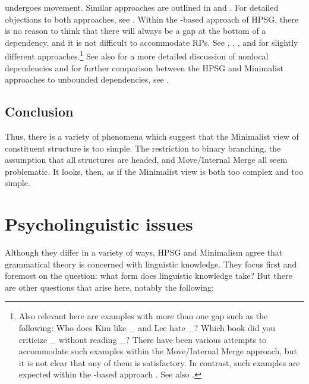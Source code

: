 \documentclass[output=paper
 	        ,biblatex
                ,babelshorthands
                ,newtxmath
                ,draftmode
                ,colorlinks, citecolor=brown
]{langscibook}
\begin{document}
undergoes movement. Similar approaches are outlined in \citet{AounChoueiriHornstein2001a-u} and
\citet{Boeckx.2003}. For detailed objections to both approaches, see
\citet[Section~3]{Borsley2013a-u}. Within the \slasch-based approach of HPSG, there is no reason to
think that there will always be a gap at the bottom of a dependency, and it is not difficult to
accommodate RPs. See \citet{Vaillette2001b}, \citet{Taghvaipour2010a-u}, \citet{Borsley2013a-u}, and \citet{crysmann_b10fg,Crysmann2016b-u} for slightly
different approaches.\footnote{%
	Also relevant here are examples with more than one gap such as the following:
	\eal
	\ex	Who does Kim like \_ and Lee hate \_?
	\ex	Which book did you criticize \_ without reading \_?
	\zl
	There have been various attempts to accommodate such examples within the Move/Internal Merge
        approach, but it is not clear that any of them is satisfactory. In contrast, such examples
        are expected within the \slasch-based approach \citep{LS2003a-u}. See also \citet[Section~4.6]{ps2}.%
}
See also  for a more detailed discussion of nonlocal dependencies and for
further comparison between the HPSG and Minimalist approaches to unbounded dependencies, see
.



\subsection{Conclusion}

Thus, there is a variety of phenomena which suggest that the Minimalist view of constituent structure
is too simple. The restriction to binary branching, the assumption that all structures are headed,
and Move/Internal Merge all seem problematic. It looks, then, as if the Minimalist view is both too
complex and too simple. 





\section{Psycholinguistic issues}
\label{sec-psycho}

Although they differ in a variety of ways, HPSG and Minimalism agree that grammatical theory is
concerned with linguistic knowledge. They focus first and foremost on the question: what form does
linguistic knowledge take? But there are other questions that arise here, notably the following: 
\end{document}
